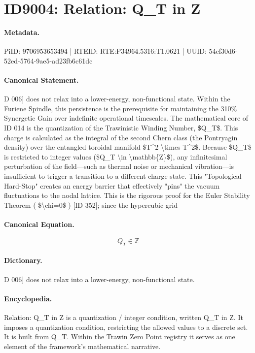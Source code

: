 \section*{ID9004: Relation: Q\_T in Z}
\paragraph{Metadata.}
PiID: 9706953653494 | RTEID: RTE:P34964.5316:T1.0621 | UUID: 54ef30d6-52ed-5764-9ae5-ad23fb6c61dc

\paragraph{Canonical Statement.}
D 006] does not relax into a lower-energy, non-functional state. Within the Furiene Spindle, this persistence is the prerequisite for maintaining the 310\% Synergetic Gain over indefinite operational timescales. The mathematical core of ID 014 is the quantization of the Trawinistic Winding Number, \$Q\_T\$. This charge is calculated as the integral of the second Chern class (the Pontryagin density) over the entangled toroidal manifold \$T\textasciicircum{}2 \textbackslash{}times T\textasciicircum{}2\$. Because \$Q\_T\$ is restricted to integer values (\$Q\_T \textbackslash{}in \textbackslash{}mathbb\{Z\}\$), any infinitesimal perturbation of the field—such as thermal noise or mechanical vibration—is insufficient to trigger a transition to a different charge state. This "Topological Hard-Stop" creates an energy barrier that effectively "pins" the vacuum fluctuations to the nodal lattice. This is the rigorous proof for the Euler Stability Theorem ( \$\textbackslash{}chi=0\$ ) [ID 352]; since the hypercubic grid

\paragraph{Canonical Equation.}
\[
Q_T \in \mathbb{Z}
\]

\paragraph{Dictionary.}
D 006] does not relax into a lower-energy, non-functional state.

\paragraph{Encyclopedia.}
Relation: Q\_T in Z is a quantization / integer condition, written Q\_T in Z. It imposes a quantization condition, restricting the allowed values to a discrete set. It is built from Q\_T. Within the Trawin Zero Point registry it serves as one element of the framework's mathematical narrative.
